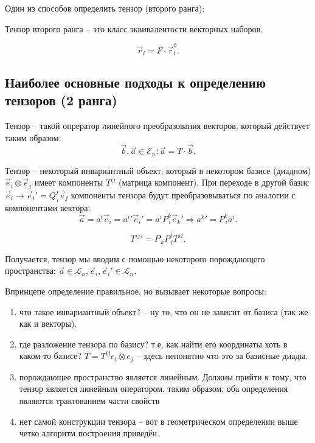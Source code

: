 Один из способов определить тензор (второго ранга):

\begin{definition}
  Тензор второго ранга -- это класс эквивалентости векторных наборов.
\end{definition}

\[
  \vec{r}_i = F \cdot \vec{r}_i^0.
\]
\newline

\subsection{Наиболее основные подходы к определению тензоров (2 ранга)}

\begin{definition}
  Тензор -- такой опрератор линейного преобразования векторов, который действует таким образом:
  \[
    \vec{b}, \vec{a} \in \mathcal{E}_n : \vec{a} = T \cdot \vec{b}.
  \]
\end{definition}

\begin{definition}
  Тензор -- некоторый инвариантный объект, который в некотором базисе (диадном) $\vec{e}_i \otimes \vec{e}_j$ имеет компоненты $T^{ij}$ (матрица компонент).
  При переходе в другой базис $\vec{e}_i \to \vec{e}_i' = Q^j_{\, i} \vec{e}_j$ компоненты тензора
  будут преобразовываться по аналогии с компонентами вектора:
  \[
    \vec{a} = a^i \vec{e}_i = {a^i}' {\vec{e}_i}' = a^i P^k_{\,i} \vec{e}_k'
    \Rightarrow
    {a^k}' = P^k_{\, i} a^i.
  \]

  \[
    {T^{ij}}' = P^i_{\, k} P^j_{\, l} T^{kl}.
  \]

\end{definition}

Получается, тензор мы вводим с помощью некоторого порождающего пространства:
$\vec{a} \in \mathcal{L}_n, \vec{e}_i, \vec{e}_i' \in \mathcal{L}_n$.

Впринцепе определение правильное, но вызывает некоторые вопросы:
\begin{enumerate}
  \item что такое инвариантный объект? -- ну то, что он не зависит от базиса (так же как и векторы).

  \item где разложение тензора по базису? т.е. как найти его координаты хоть в каком-то базисе? 
    $T = T^{ij} e_i \otimes e_j$ -- здесь непонятно что это за базисные диады.

  \item порождающее пространство является линейным. Должны прийти к тому, что тензор является
    линейным оператором. таким образом, оба определения являются трактованием части свойств
    
    \begin{figure}[H]
    	\centering
    	
    \end{figure}

  \item нет самой конструкции тензора -- вот в геометрическом определении выше четко алгоритм 
    построения приведён.
\end{enumerate}


